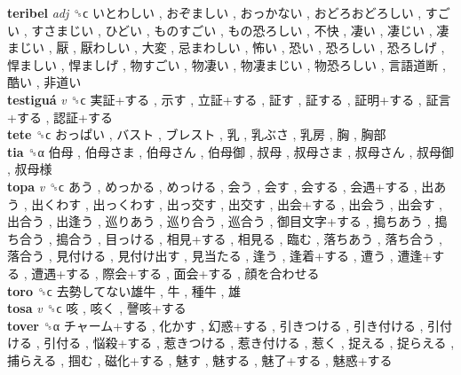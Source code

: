 \textbf{teribel} \emph{adj}  ␝ϲ   いとわしい ,  おぞましい ,  おっかない ,  おどろおどろしい ,  すごい ,  すさまじい ,  ひどい ,  ものすごい ,  もの恐ろしい ,  不快 ,  凄い ,  凄じい ,  凄まじい ,  厭 ,  厭わしい ,  大変 ,  忌まわしい ,  怖い ,  恐い ,  恐ろしい ,  恐ろしげ ,  悍ましい ,  悍ましげ ,  物すごい ,  物凄い ,  物凄まじい ,  物恐ろしい ,  言語道断 ,  酷い ,  非道い   \\
\textbf{testiguá} \emph{v}  ␝ϲ   実証+する ,  示す ,  立証+する ,  証す ,  証する ,  証明+する ,  証言+する ,  認証+する   \\
\textbf{tete} ␝ϲ   おっぱい ,  バスト ,  ブレスト ,  乳 ,  乳ぶさ ,  乳房 ,  胸 ,  胸部   \\
\textbf{tia} ␝α   伯母 ,  伯母さま ,  伯母さん ,  伯母御 ,  叔母 ,  叔母さま ,  叔母さん ,  叔母御 ,  叔母様   \\
\textbf{topa} \emph{v}  ␝ϲ   あう ,  めっかる ,  めっける ,  会う ,  会す ,  会する ,  会遇+する ,  出あう ,  出くわす ,  出っくわす ,  出っ交す ,  出交す ,  出会+する ,  出会う ,  出会す ,  出合う ,  出逢う ,  巡りあう ,  巡り合う ,  巡合う ,  御目文字+する ,  搗ちあう ,  搗ち合う ,  搗合う ,  目っける ,  相見+する ,  相見る ,  臨む ,  落ちあう ,  落ち合う ,  落合う ,  見付ける ,  見付け出す ,  見当たる ,  逢う ,  逢着+する ,  遭う ,  遭逢+する ,  遭遇+する ,  際会+する ,  面会+する ,  顔を合わせる   \\
\textbf{toro} ␝ϲ   去勢してない雄牛 ,  牛 ,  種牛 ,  雄   \\
\textbf{tosa} \emph{v}  ␝ϲ   咳 ,  咳く ,  謦咳+する   \\
\textbf{tover} ␝α   チャーム+する ,  化かす ,  幻惑+する ,  引きつける ,  引き付ける ,  引付ける ,  引付る ,  悩殺+する ,  惹きつける ,  惹き付ける ,  惹く ,  捉える ,  捉らえる ,  捕らえる ,  掴む ,  磁化+する ,  魅す ,  魅する ,  魅了+する ,  魅惑+する   \\
